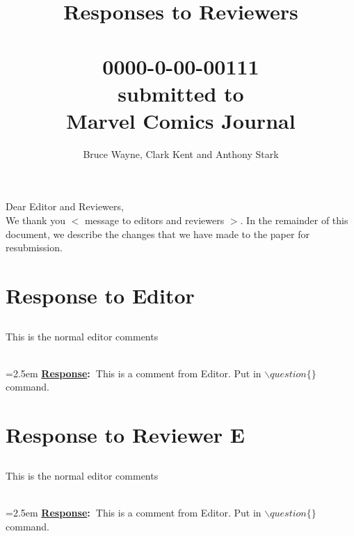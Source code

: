 \documentclass{article}
\newcommand{\answer}[1]{~\\\vspace{0.1em} \hangindent=2.5em \textbf{\textcolor{NavyBlue}{\uline{Response}:~}}\textcolor{NavyBlue}{#1}}
\newcommand\getcurrentref[1]{%
	\ifnumequal{\value{#1}}{0}
	{E}
	{\the\value{#1}}%
}
\newcommand{\getCurrentSectionNumber}{\getcurrentref{section}}
\begin{document}
	\title{Responses to Reviewers\\~\\0000-0-00­-00111\\submitted to\\Marvel Comics Journal}
	
	\author{Bruce Wayne, Clark Kent and Anthony Stark}
	\maketitle 
	\noindent Dear Editor and Reviewers,\\
	
	\noindent We thank you $<$ message to editors and reviewers $>$.
	In the remainder of this document, we describe the changes that we have made to the paper for resubmission.
	
%	
	
	\section{Response to Editor}
	
	\subsection{} This is the normal editor comments
	
	\answer {This is a   comment from Editor. Put in $\backslash question \{\}$command.}
	
		
	\section{Response to Reviewer \getCurrentSectionNumber}
	
	\subsection{} This is the normal editor comments
	
	\answer {This is a comment  from Editor. Put in $\backslash question \{\}$command.}
	
\end{document}
